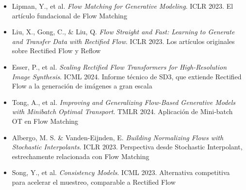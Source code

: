 \documentclass[a4paper]{article}
\begin{document}
\begin{itemize}
    \item Lipman, Y., et al. \textit{Flow Matching for Generative Modeling}. ICLR 2023. {\small El artículo fundacional de Flow Matching}
    \item Liu, X., Gong, C., \& Liu, Q. \textit{Flow Straight and Fast: Learning to Generate and Transfer Data with Rectified Flow}. ICLR 2023. {\small Los artículos originales sobre Rectified Flow y Reflow}
    \item Esser, P., et al. \textit{Scaling Rectified Flow Transformers for High-Resolution Image Synthesis}. ICML 2024. {\small Informe técnico de SD3, que extiende Rectified Flow a la generación de imágenes a gran escala}
    \item Tong, A., et al. \textit{Improving and Generalizing Flow-Based Generative Models with Minibatch Optimal Transport}. TMLR 2024. {\small Aplicación de Mini-batch OT en Flow Matching}
    \item Albergo, M. S. \& Vanden-Eijnden, E. \textit{Building Normalizing Flows with Stochastic Interpolants}. ICLR 2023. {\small Perspectiva desde Stochastic Interpolant, estrechamente relacionada con Flow Matching}
    \item Song, Y., et al. \textit{Consistency Models}. ICML 2023. {\small Alternativa competitiva para acelerar el muestreo, comparable a Rectified Flow}
\end{itemize}

\end{document}
